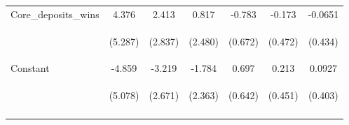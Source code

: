 \documentclass[]{article}
\begin{document}
\begin{center}
\begin{tabular}{lcccccc}
Core\_deposits\_wins & 4.376 & 2.413 & 0.817 & -0.783 & -0.173 & -0.0651 \\
\vspace{4pt} & \begin{footnotesize}(5.287)\end{footnotesize} & \begin{footnotesize}(2.837)\end{footnotesize} & \begin{footnotesize}(2.480)\end{footnotesize} & \begin{footnotesize}(0.672)\end{footnotesize} & \begin{footnotesize}(0.472)\end{footnotesize} & \begin{footnotesize}(0.434)\end{footnotesize} \\
Constant & -4.859 & -3.219 & -1.784 & 0.697 & 0.213 & 0.0927 \\
 & \begin{footnotesize}(5.078)\end{footnotesize} & \begin{footnotesize}(2.671)\end{footnotesize} & \begin{footnotesize}(2.363)\end{footnotesize} & \begin{footnotesize}(0.642)\end{footnotesize} & \begin{footnotesize}(0.451)\end{footnotesize} & \begin{footnotesize}(0.403)\end{footnotesize} \\
\vspace{4pt} & \begin{footnotesize}\end{footnotesize} & \begin{footnotesize}\end{footnotesize} & \begin{footnotesize}\end{footnotesize} & \begin{footnotesize}\end{footnotesize} & \begin{footnotesize}\end{footnotesize} & \begin{footnotesize}\end{footnotesize} \\

\end{tabular}
\end{center}
\end{document}
